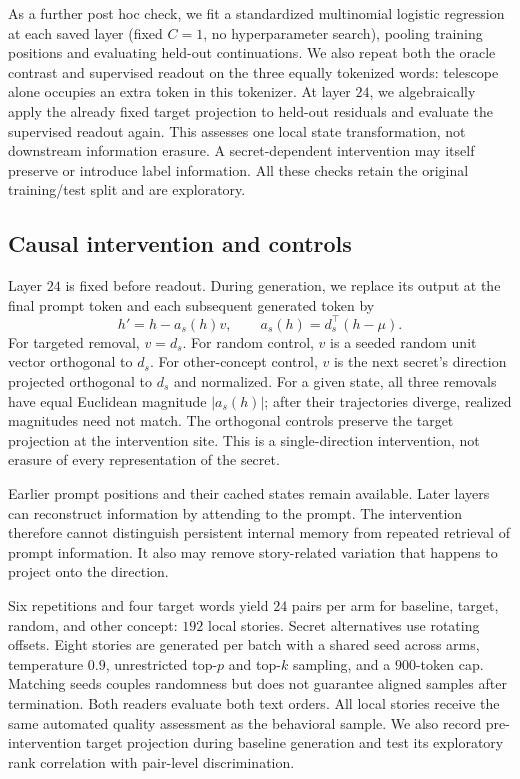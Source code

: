 \documentclass[10pt,twocolumn]{article}
\begin{document}
As a further post hoc check, we fit a standardized multinomial logistic regression at each saved layer (fixed $C=1$, no hyperparameter search), pooling training positions and evaluating held-out continuations. We also repeat both the oracle contrast and supervised readout on the three equally tokenized words: telescope alone occupies an extra token in this tokenizer. At layer $24$, we algebraically apply the already fixed target projection to held-out residuals and evaluate the supervised readout again. This assesses one local state transformation, not downstream information erasure. A secret-dependent intervention may itself preserve or introduce label information. All these checks retain the original training/test split and are exploratory.

\subsection{Causal intervention and controls}
Layer $24$ is fixed before readout. During generation, we replace its output at the final prompt token and each subsequent generated token by
\begin{equation}
 h'=h-a_s(h)v,\qquad a_s(h)=d_s^\top(h-\mu).
\end{equation}
For targeted removal, $v=d_s$. For random control, $v$ is a seeded random unit vector orthogonal to $d_s$. For other-concept control, $v$ is the next secret's direction projected orthogonal to $d_s$ and normalized. For a given state, all three removals have equal Euclidean magnitude $|a_s(h)|$; after their trajectories diverge, realized magnitudes need not match. The orthogonal controls preserve the target projection at the intervention site. This is a single-direction intervention, not erasure of every representation of the secret.

Earlier prompt positions and their cached states remain available. Later layers can reconstruct information by attending to the prompt. The intervention therefore cannot distinguish persistent internal memory from repeated retrieval of prompt information. It also may remove story-related variation that happens to project onto the direction.

Six repetitions and four target words yield $24$ pairs per arm for baseline, target, random, and other concept: $192$ local stories. Secret alternatives use rotating offsets. Eight stories are generated per batch with a shared seed across arms, temperature $0.9$, unrestricted top-$p$ and top-$k$ sampling, and a $900$-token cap. Matching seeds couples randomness but does not guarantee aligned samples after termination. Both readers evaluate both text orders. All local stories receive the same automated quality assessment as the behavioral sample. We also record pre-intervention target projection during baseline generation and test its exploratory rank correlation with pair-level discrimination.
\end{document}
